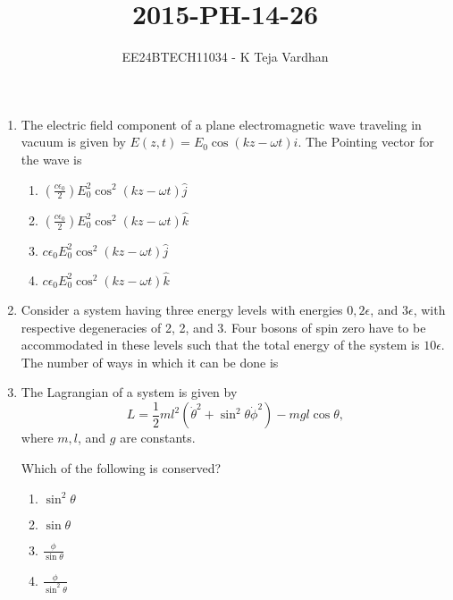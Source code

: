 \documentclass{article}
\newcommand{\brak}[1]{\left( #1 \right)}
\begin{document}

\title{2015-PH-14-26}
\author{EE24BTECH11034 - K Teja Vardhan}
{\let\newpage\relax\maketitle}

\begin{enumerate}

 \item The electric field component of a plane electromagnetic wave traveling in vacuum is given by $E\brak{z,t} = E_0 \cos\brak{kz - \omega t}\hat{i}$. The Pointing vector for the wave is

        \begin{enumerate}
            \item $\brak{\frac{c \epsilon_0}{2}}E_0^2 \cos^2\brak{kz - \omega t} \hat{j}$
            \item $\brak{\frac{c \epsilon_0}{2}}E_0^2 \cos^2\brak{kz - \omega t} \hat{k}$
            \item $c \epsilon_0 E_0^2 \cos^2\brak{kz - \omega t} \hat{j}$
            \item $c \epsilon_0 E_0^2 \cos^2\brak{kz - \omega t} \hat{k}$
        \end{enumerate}

    \item Consider a system having three energy levels with energies $0, 2\epsilon$, and $3\epsilon$, with respective degeneracies of 2, 2, and 3. Four bosons of spin zero have to be accommodated in these levels such that the total energy of the system is $10\epsilon$.  
 The number of ways in which it can be done is \underline{\hspace{2cm}}

    \item The Lagrangian of a system is given by
    $$L = \frac{1}{2}ml^2\brak{\dot{\theta}^2 + \sin^2\theta \dot{\phi}^2} - mgl\cos\theta,$$
    where $m, l$, and $g$ are constants.

    Which of the following is conserved?

    \begin{enumerate}
        \item $\sin^2\theta$
        \item $\sin\theta$
        \item $\frac{\phi}{\sin\theta}$
        \item $\frac{\phi}{\sin^2\theta}$
    \end{enumerate}


\end{enumerate}
\end{document}
